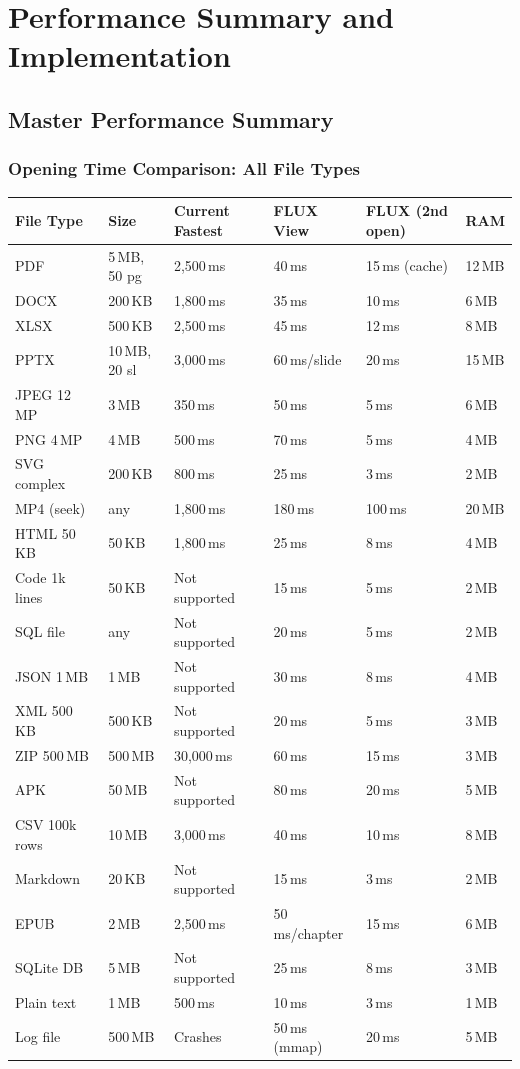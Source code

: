 \documentclass[11pt, a4paper, openright]{report}
\begin{document}
\part{Performance Summary and Implementation}

\chapter{Master Performance Summary}

\section{Opening Time Comparison: All File Types}

\begin{longtable}{@{}p{22mm}p{24mm}p{28mm}p{28mm}p{26mm}p{18mm}@{}}
\toprule
\textbf{File Type} & \textbf{Size} & \textbf{Current Fastest} & \textbf{FLUX View} & \textbf{FLUX (2nd open)} & \textbf{RAM} \\
\midrule
PDF & 5\,MB, 50 pg & 2,500\,ms & 40\,ms & 15\,ms (cache) & 12\,MB \\
DOCX & 200\,KB & 1,800\,ms & 35\,ms & 10\,ms & 6\,MB \\
XLSX & 500\,KB & 2,500\,ms & 45\,ms & 12\,ms & 8\,MB \\
PPTX & 10\,MB, 20 sl & 3,000\,ms & 60\,ms/slide & 20\,ms & 15\,MB \\
JPEG 12\,MP & 3\,MB & 350\,ms & 50\,ms & 5\,ms & 6\,MB \\
PNG 4\,MP & 4\,MB & 500\,ms & 70\,ms & 5\,ms & 4\,MB \\
SVG complex & 200\,KB & 800\,ms & 25\,ms & 3\,ms & 2\,MB \\
MP4 (seek) & any & 1,800\,ms & 180\,ms & 100\,ms & 20\,MB \\
HTML 50\,KB & 50\,KB & 1,800\,ms & 25\,ms & 8\,ms & 4\,MB \\
Code 1k lines & 50\,KB & Not supported & 15\,ms & 5\,ms & 2\,MB \\
SQL file & any & Not supported & 20\,ms & 5\,ms & 2\,MB \\
JSON 1\,MB & 1\,MB & Not supported & 30\,ms & 8\,ms & 4\,MB \\
XML 500\,KB & 500\,KB & Not supported & 20\,ms & 5\,ms & 3\,MB \\
ZIP 500\,MB & 500\,MB & 30,000\,ms & 60\,ms & 15\,ms & 3\,MB \\
APK & 50\,MB & Not supported & 80\,ms & 20\,ms & 5\,MB \\
CSV 100k rows & 10\,MB & 3,000\,ms & 40\,ms & 10\,ms & 8\,MB \\
Markdown & 20\,KB & Not supported & 15\,ms & 3\,ms & 2\,MB \\
EPUB & 2\,MB & 2,500\,ms & 50\,ms/chapter & 15\,ms & 6\,MB \\
SQLite DB & 5\,MB & Not supported & 25\,ms & 8\,ms & 3\,MB \\
Plain text & 1\,MB & 500\,ms & 10\,ms & 3\,ms & 1\,MB \\
Log file & 500\,MB & Crashes & 50\,ms (mmap) & 20\,ms & 5\,MB \\
\bottomrule
\end{longtable}
\end{document}
